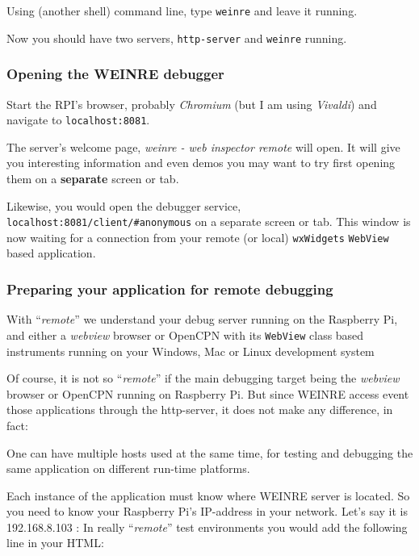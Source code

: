 \documentclass[11pt]{article}
\begin{document}
    Using (another shell) command line, type \texttt{weinre} and leave it
running.

    Now you should have two servers, \texttt{http-server} and
\texttt{weinre} running.

    \hypertarget{opening-the-weinre-debugger}{%
\subsubsection{Opening the WEINRE
debugger}\label{opening-the-weinre-debugger}}

    Start the RPI's browser, probably \emph{Chromium} (but I am using
\emph{Vivaldi}) and navigate to \texttt{localhost:8081}.

    The server's welcome page, \emph{weinre - web inspector remote} will
open. It will give you interesting information and even demos you may
want to try first opening them on a \textbf{separate} screen or tab.

    Likewise, you would open the debugger service,
\texttt{localhost:8081/client/\#anonymous} on a separate screen or tab.
This window is now waiting for a connection from your remote (or local)
\texttt{wxWidgets} \texttt{WebView} based application.

    \hypertarget{preparing-your-application-for-remote-debugging}{%
\subsubsection{Preparing your application for remote
debugging}\label{preparing-your-application-for-remote-debugging}}

    With ``\emph{remote}'' we understand your debug server running on the
Raspberry Pi, and either a \emph{webview} browser or OpenCPN with its
\texttt{WebView} class based instruments running on your Windows, Mac or
Linux development system

    Of course, it is not so ``\emph{remote}'' if the main debugging target
being the \emph{webview} browser or OpenCPN running on Raspberry Pi. But
since WEINRE access event those applications through the http-server, it
does not make any difference, in fact:

    One can have multiple hosts used at the same time, for testing and
debugging the same application on different run-time platforms.

    Each instance of the application must know where WEINRE server is
located. So you need to know your Raspberry Pi's IP-address in your
network. Let's say it is 192.168.8.103 : In really ``\emph{remote}''
test environments you would add the following line in your HTML:
\end{document}
